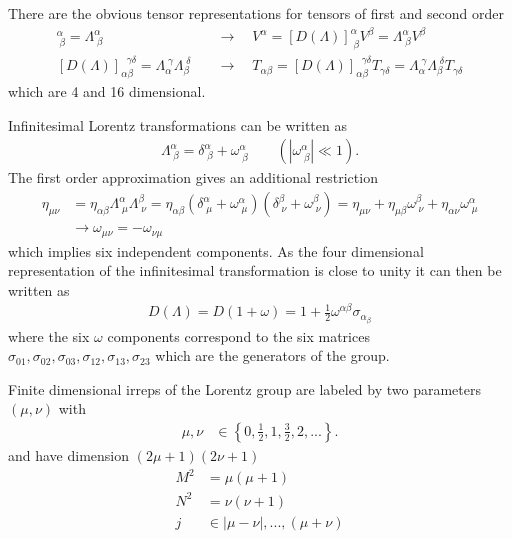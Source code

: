 \documentclass[10pt,a4paper]{book}
\theoremstyle{definition}
\begin{document}
There are the obvious tensor representations for tensors of first and second order
\begin{align}
    [D(\Lambda)]^\alpha_{\;\beta}=\Lambda^\alpha_{\;\beta}\quad &\rightarrow\quad V^\alpha = [D(\Lambda)]^\alpha_{\;\beta} V^\beta=\Lambda^\alpha_{\;\beta} V^\beta\\
    [D(\Lambda)]_{\alpha\beta}^{\;\;\gamma\delta}=\Lambda_\alpha^{\;\gamma}\Lambda_\beta^{\;\delta}\quad&\rightarrow\quad T_{\alpha\beta} = [D(\Lambda)]_{\alpha\beta}^{\;\;\gamma\delta} T_{\gamma\delta}=\Lambda_\alpha^{\;\gamma}\Lambda_\beta^{\;\delta}T_{\gamma\delta}
\end{align}
which are 4 and 16 dimensional.

Infinitesimal Lorentz transformations can be written as
\begin{align}
    \Lambda^\alpha_{\;\beta}=\delta^\alpha_{\;\beta}+\omega^\alpha_{\;\beta}\qquad(|\omega^\alpha_{\;\beta}|\ll 1).
\end{align}
The first order approximation gives an additional restriction
\begin{align}
    \eta_{\mu\nu} &= \eta_{\alpha\beta}\Lambda^\alpha_{\;\mu}\Lambda^\beta_{\;\nu}=\eta_{\alpha\beta}(\delta^\alpha_{\;\mu}+\omega^\alpha_{\;\mu})(\delta^\beta_{\;\nu}+\omega^\beta_{\;\nu})=\eta_{\mu\nu}+\eta_{\mu\beta}\omega^\beta_{\;\nu}+\eta_{\alpha\nu}\omega^\alpha_{\;\mu}\\
    &\rightarrow \omega_{\mu\nu}=-\omega_{\nu\mu}
\end{align}
which implies six independent components. As the four dimensional representation of the infinitesimal transformation is close to unity it can then be written as
\begin{align}
    D(\Lambda)=D(1+\omega)=1+\frac{1}{2}\omega^{\alpha\beta}\sigma_{\alpha_\beta}
\end{align}
where the six $\omega$ components correspond to the six matrices $\sigma_{01},\sigma_{02},\sigma_{03},\sigma_{12},\sigma_{13},\sigma_{23}$ which are the generators of the group.


Finite dimensional irreps of the Lorentz group are labeled by two parameters $(\mu,\nu)$ with
\begin{align}
    \mu,\nu &\in \left\{0,\frac{1}{2},1,\frac{3}{2},2,...\right\}.
\end{align}
and have dimension $(2\mu+1)(2\nu+1)$
\begin{align*}
    M^2&=\mu(\mu+1)\\
    N^2&=\nu(\nu+1)\\
    j  &\in |\mu-\nu|, ..., (\mu+\nu)
\end{align*}
\end{document}
